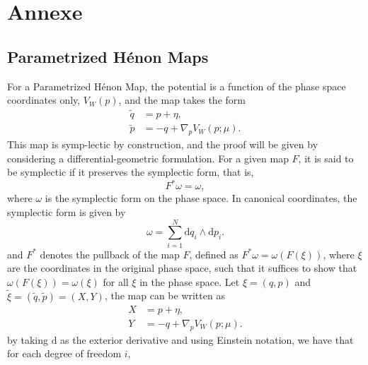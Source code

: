 \documentclass[11pt,a4paper]{article}
\begin{document}
\begin{sloppypar}
%
% 





\newpage
\appendix %

\section{Annexe}
\label{Annexe}

\subsection{Parametrized H\'enon Maps}
For a Parametrized H\'enon Map, the potential is a function of the phase space coordinates only, $V_W(p)$, and the map takes the form
\begin{equation}
\begin{aligned}
\tilde q &= p + \eta,\\
\tilde p &= -q + \nabla_p V_W(p;\mu).
\end{aligned}
\end{equation}
This map is symp-lectic by construction, and the proof will be given by considering a differential-geometric formulation. For a given map $F$, it is said to be symplectic if it preserves the symplectic form, that is,
\begin{equation*}
F^* \omega = \omega,
\end{equation*}
where $\omega$ is the symplectic form on the phase space. In canonical coordinates, the symplectic form is given by
\begin{equation}
\omega = \sum_{i=1}^N \mathrm{d}q_i \wedge \mathrm{d}p_i.
\end{equation}
and $F^*$ denotes the pullback of the map $F$, defined as $F^* \omega = \omega(F(\xi))$, where $\xi$ are the coordinates in the original phase space, such that it suffices to show that $\omega(F(\xi)) = \omega(\xi)$ for all $\xi$ in the phase space.
Let $\xi=(q,p)$ and $\tilde \xi = (\tilde q,\tilde p) = (X,Y)$, the map can be written as 
\begin{equation}
\begin{aligned}
X &= p + \eta,\\
Y &= -q + \nabla_p V_W(p;\mu).
\end{aligned}
\end{equation}
by taking $\mathrm{d}$ as the exterior derivative and using Einstein notation, we have that for each degree of freedom $i$,
\begin{equation}

\end{equation}
\end{sloppypar}
\end{document}

